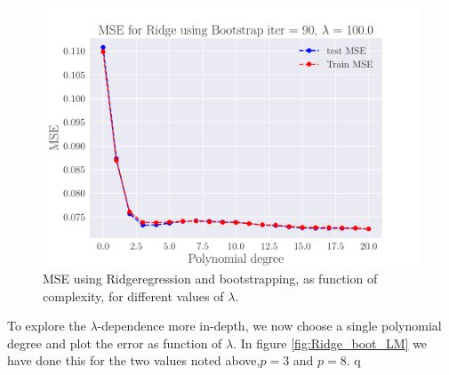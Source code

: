 \documentclass[reprint,english,notitlepage,aps,nobalancelastpage,nofootinbib]{revtex4-1}  %
\begin{document}
\begin{figure}[H]
	\endminipage\hfill
	\includegraphics[width=\linewidth]{MSE_Ridge_n30_eps02_pol20_Bootstrap_re90_lam_100_0.pdf}
	\endminipage
	\caption{MSE using Ridgeregression and bootstrapping, as function of complexity, for different values of $\lambda$.} \label{fig:Ridge_boot_PM}
\end{figure}

To explore the $\lambda$-dependence more in-depth, we now choose a single polynomial degree and  plot the error as function of $\lambda$.  In figure \ref{fig:Ridge_boot_LM} we have done this for the two values noted above,$p=3$ and $p=8$.
q
\end{document}
